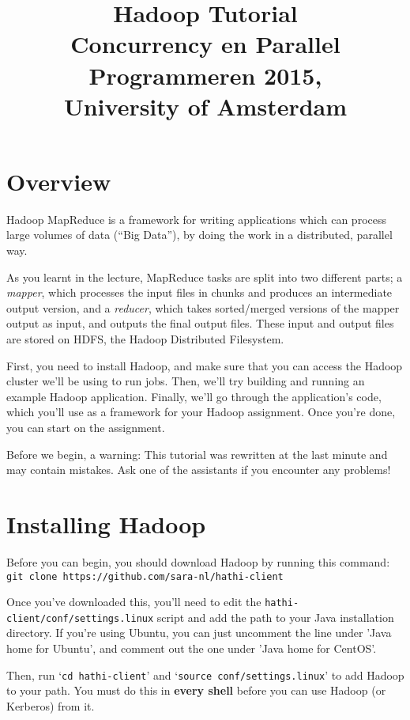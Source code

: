 \documentclass[a4paper,11pt]{article}
\date{}
\title{Hadoop Tutorial\\
  Concurrency en Parallel Programmeren 2015,\\
  University of Amsterdam
}
\begin{document}
  \maketitle
  
  \tableofcontents
  
  \section{Overview}
  
  Hadoop MapReduce is a framework for writing applications which can process large volumes of data (``Big Data''), by doing the work in a distributed,
  parallel way.

  As you learnt in the lecture, MapReduce tasks are split into two different parts; a \emph{mapper}, which processes the input files in chunks and
  produces an intermediate output version, and a \emph{reducer}, which takes sorted/merged versions of the mapper output as input, and outputs
  the final output files. These input and output files are stored on HDFS, the Hadoop Distributed Filesystem.

  First, you need to install Hadoop, and make sure that you can access the Hadoop cluster we'll be using to run jobs.
  Then, we'll try building and running an example Hadoop application. Finally, we'll go through the application's code, which
  you'll use as a framework for your Hadoop assignment. Once you're done, you can start on the assignment.

  Before we begin, a warning: This tutorial was rewritten at the last minute and may contain mistakes. Ask one of the assistants
  if you encounter any problems!

  \pagebreak
  \section{Installing Hadoop}

  Before you can begin, you should download Hadoop by running this command:\\
  \texttt{git clone https://github.com/sara-nl/hathi-client}

  Once you've downloaded this, you'll need to edit the \texttt{hathi-client/conf/settings.linux} script
  and add the path to your Java installation directory. If you're using Ubuntu, you can just uncomment
  the line under 'Java home for Ubuntu', and comment out the one under 'Java home for CentOS'.

  Then, run `\texttt{cd hathi-client}' and `\texttt{source conf/settings.linux}' to add Hadoop
  to your path. You must do this in \textbf{every shell} before you can use Hadoop (or Kerberos) from it.
  
\end{document}
